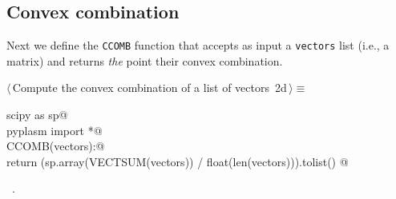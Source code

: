 \documentclass[11pt,oneside]{article}	%
\begin{document}
\subsection{Convex combination}
Next we define the \texttt{CCOMB} function that accepts as input a \texttt{vectors} list (i.e., a matrix) and returns \emph{the} point their convex combination.
\begin{flushleft} \small
\begin{minipage}{\linewidth} \label{scrap4}
\protect{}$\langle\,$Compute the convex combination of a list of vectors\nobreak\ {\footnotesize 2d}$\,\rangle\equiv$
\vspace{-1ex}
\begin{list}{}{} \item
\mbox{}\verb@import scipy as sp@\\
\mbox{}\verb@from pyplasm import *@\\
\mbox{}\verb@def CCOMB(vectors):@\\
\mbox{}\verb@    return (sp.array(VECTSUM(vectors)) / float(len(vectors))).tolist()  @\\
\mbox{}\verb@@{\NWsep}
\end{list}
\vspace{-1ex}
\footnotesize\addtolength{\baselineskip}{-1ex}
\begin{list}{}{\setlength{\itemsep}{-\parsep}\setlength{\itemindent}{-\leftmargin}}
\item \NWtxtMacroRefIn\ .
\end{list}
\end{minipage}\\[4ex]
\end{flushleft}
\end{document}
